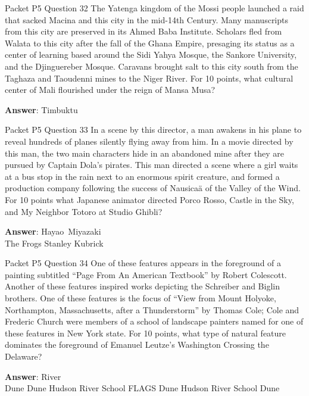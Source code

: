 \begin{frame}{Packet P5 Question 32}
The Yatenga kingdom of the Mossi people launched a raid that sacked Macina and this city in the mid-14th Century. Many manuscripts from this city are preserved in its Ahmed Baba Institute. Scholars fled from Walata to this city after the fall of the Ghana Empire, presaging its status as a center of learning based around the Sidi Yahya Mosque,   the Sankore University,   and the Djinguereber Mosque. Caravans     brought salt to this city south from the Taghaza and Taoudenni mines to the Niger River. For 10 points, what cultural center of Mali flourished under the reign of Mansa Musa?

\textbf{Answer}: Timbuktu\\
\end{frame}

\begin{frame}{Packet P5 Question 33}
In a scene by this director, a man awakens in his plane to reveal hundreds of planes silently flying away from him. In a movie directed by this man, the two main characters hide in an abandoned mine after they are pursued by Captain Dola's pirates. This man directed a scene where a girl waits at a bus stop in the rain next to an enormous spirit creature, and formed   a production company following the success of Nausicaä of the Valley of the Wind. For 10 points what Japanese animator directed Porco Rosso, Castle in the Sky, and My Neighbor Totoro at Studio Ghibli?      

\textbf{Answer}: Hayao\ Miyazaki\\
 The Frogs
 Stanley Kubrick
\end{frame}

\begin{frame}{Packet P5 Question 34}
One of these features   appears in the foreground of a painting subtitled “Page From An American Textbook” by Robert Colescott. Another of these features inspired works depicting the Schreiber and Biglin brothers. One of these features is the focus of ``View from Mount Holyoke, Northampton, Massachusetts, after a Thunderstorm'' by Thomas Cole;   Cole and Frederic Church were members of a school of landscape painters named for   one of these features in New York state. For 10 points, what type of natural feature dominates the foreground of Emanuel Leutze’s Washington Crossing the Delaware?        

\textbf{Answer}: River\\
 Dune
 Dune
 Hudson River School
 FLAGS
 Dune
 Hudson River School
 Dune
\end{frame}

